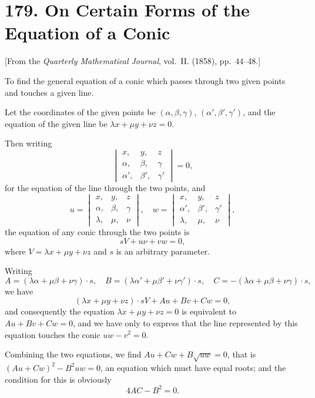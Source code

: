 \documentclass[11pt,a4paper]{book}
\begin{document}
\section*{179. On Certain Forms of the Equation of a Conic}

[From the \textit{Quarterly Mathematical Journal}, vol.~II. (1858), pp.~44--48.]

To find the general equation of a conic which passes through two given points and touches a given line.

Let the coordinates of the given points be $(\alpha, \beta, \gamma)$, $(\alpha', \beta', \gamma')$, and the equation of the given line be $\lambda x + \mu y + \nu z = 0$.

Then writing
\[
\begin{vmatrix}
x, & y, & z \\
\alpha, & \beta, & \gamma \\
\alpha', & \beta', & \gamma'
\end{vmatrix} = 0,
\]
for the equation of the line through the two points, and
\[
u = \begin{vmatrix} x, & y, & z \\ \alpha, & \beta, & \gamma \\ \lambda, & \mu, & \nu \end{vmatrix}, \quad
w = \begin{vmatrix} x, & y, & z \\ \alpha', & \beta', & \gamma' \\ \lambda, & \mu, & \nu \end{vmatrix},
\]
the equation of any conic through the two points is
\[
sV + u\nu + vw = 0,
\]
where $V = \lambda x + \mu y + \nu z$ and $s$ is an arbitrary parameter.

Writing
\[
A = (\lambda\alpha + \mu\beta + \nu\gamma) \cdot s, \quad
B = (\lambda\alpha' + \mu\beta' + \nu\gamma') \cdot s, \quad
C = -(\lambda\alpha + \mu\beta + \nu\gamma) \cdot s,
\]
we have
\[
(\lambda x + \mu y + \nu z) \cdot sV + Au + Bv + Cw = 0,
\]
and consequently the equation $\lambda x + \mu y + \nu z = 0$ is equivalent to $Au + Bv + Cw = 0$, and we have only to express that the line represented by this equation touches the conic $uw - v^2 = 0$.

Combining the two equations, we find $Au + Cw + B\sqrt{uw} = 0$, that is $(Au + Cw)^2 - B^2uw = 0$, an equation which must have equal roots; and the condition for this is obviously
\[
4AC - B^2 = 0.
\]
\end{document}

